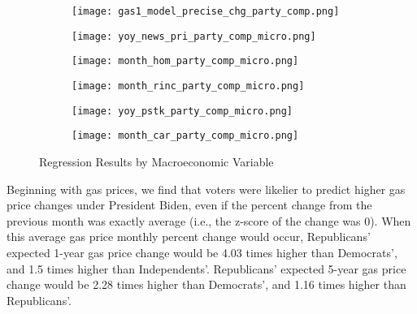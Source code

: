 \documentclass{article}
\begin{document}
\begin{figure}[ht!]
  \centering
  \begin{subfigure}[b]{0.49\textwidth}
    \centering
    \texttt{[image: gas1\_model\_precise\_chg\_party\_comp.png]}
    \label{fig:gas1}
  \end{subfigure}
  \begin{subfigure}[b]{0.49\textwidth}
    \centering
    \texttt{[image: yoy\_news\_pri\_party\_comp\_micro.png]}
    \label{fig:newsrn}
  \end{subfigure}
   \begin{subfigure}[b]{0.49\textwidth}
    \centering
    \texttt{[image: month\_hom\_party\_comp\_micro.png]}
    \label{fig:hom}
  \end{subfigure}
   \begin{subfigure}[b]{0.49\textwidth}
    \centering
    \texttt{[image: month\_rinc\_party\_comp\_micro.png]}
    \label{fig:rinc}
  \end{subfigure}
   \begin{subfigure}[b]{0.49\textwidth}
    \centering
    \texttt{[image: yoy\_pstk\_party\_comp\_micro.png]}
    \label{fig:pstk}
  \end{subfigure}
   \begin{subfigure}[b]{0.49\textwidth}
    \centering
    \texttt{[image: month\_car\_party\_comp\_micro.png]}
    \label{fig:veh}
  \end{subfigure}
  \caption{Regression Results by Macroeconomic Variable}
  \label{fig:panel}
\end{figure}

Beginning with gas prices, we find that voters were likelier to predict higher gas price changes under President Biden, even if the percent change from the previous month was exactly average (i.e., the z-score of the change was 0). When this average gas price monthly percent change would occur, Republicans' expected 1-year gas price change would be 4.03 times higher than Democrats', and 1.5 times higher than Independents'. Republicans' expected 5-year gas price change would be 2.28 times higher than Democrats', and 1.16 times higher than Republicans'. 
\end{document}
